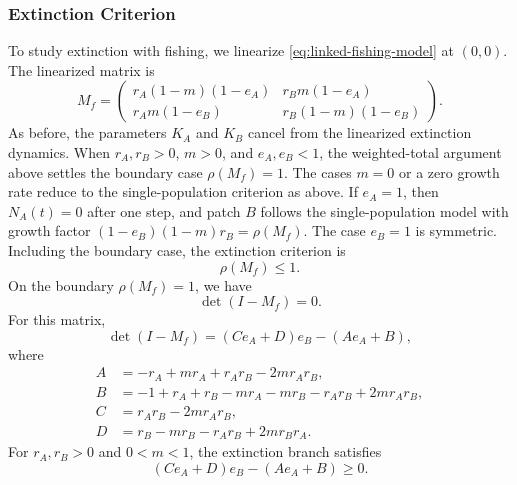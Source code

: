 \documentclass{article}
\numberwithin{equation}{section}
\begin{document}
\subsubsection{Extinction Criterion}
To study extinction with fishing, we linearize
\eqref{eq:linked-fishing-model} at $(0,0)$. The linearized matrix is
\begin{equation}
    \label{eq:linked-fishing-linear-matrix}
    M_f=
    \begin{pmatrix}
        r_A(1-m)(1-e_A) & r_Bm(1-e_A)\\
        r_Am(1-e_B) & r_B(1-m)(1-e_B)
    \end{pmatrix}.
\end{equation}
As before, the parameters $K_A$ and $K_B$ cancel from the linearized
extinction dynamics. When $r_A,r_B>0$, $m>0$, and $e_A,e_B<1$, the
weighted-total argument above settles the boundary case $\rho(M_f)=1$.
The cases $m=0$ or a zero growth rate reduce to the single-population
criterion as above. If $e_A=1$, then $N_A(t)=0$ after one step, and
patch $B$ follows the single-population model with growth factor
$(1-e_B)(1-m)r_B=\rho(M_f)$. The case $e_B=1$ is symmetric.
Including the boundary case, the extinction criterion is
\begin{equation}
    \label{eq:linked-fishing-spectral-criterion}
    \rho(M_f)\leq1.
\end{equation}
On the boundary $\rho(M_f)=1$, we have
\begin{equation*}
    \det(I-M_f)=0.
\end{equation*}
For this matrix,
\begin{equation}
    \label{eq:linked-fishing-det-boundary}
    \det(I-M_f)=(Ce_A+D)e_B-(Ae_A+B),
\end{equation}
where
\begin{equation*}
    \begin{aligned}
        A &= -r_A + mr_A + r_Ar_B - 2mr_Ar_B,\\
        B &= -1 + r_A + r_B - mr_A - mr_B - r_Ar_B + 2mr_Ar_B,\\
        C &= r_Ar_B - 2mr_Ar_B,\\
        D &= r_B - mr_B - r_Ar_B + 2mr_Br_A.
    \end{aligned}
\end{equation*}
For $r_A,r_B>0$ and $0<m<1$, the extinction branch satisfies
\begin{equation}
    \label{eq:linked-fishing-det-condition}
    (Ce_A+D)e_B-(Ae_A+B)\geq0.
\end{equation}
\end{document}
